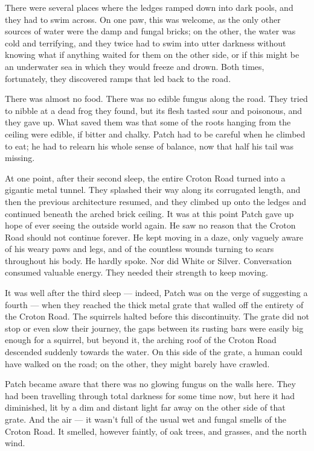 \documentclass[12pt]{book}
\begin{document}
There were several places where the ledges ramped down into dark pools, and they had to swim across. On one paw, this was welcome, as the only other sources of water were the damp and fungal bricks; on the other, the water was cold and terrifying, and they twice had to swim into utter darkness without knowing what if anything waited for them on the other side, or if this might be an underwater sea in which they would freeze and drown. Both times, fortunately, they discovered ramps that led back to the road.

There was almost no food. There was no edible fungus along the road. They tried to nibble at a dead frog they found, but its flesh tasted sour and poisonous, and they gave up. What saved them was that some of the roots hanging from the ceiling were edible, if bitter and chalky. Patch had to be careful when he climbed to eat; he had to relearn his whole sense of balance, now that half his tail was missing.

At one point, after their second sleep, the entire Croton Road turned into a gigantic metal tunnel. They splashed their way along its corrugated length, and then the previous architecture resumed, and they climbed up onto the ledges and continued beneath the arched brick ceiling. It was at this point Patch gave up hope of ever seeing the outside world again. He saw no reason that the Croton Road should not continue forever. He kept moving in a daze, only vaguely aware of his weary paws and legs, and of the countless wounds turning to scars throughout his body. He hardly spoke. Nor did White or Silver. Conversation consumed valuable energy. They needed their strength to keep moving.

It was well after the third sleep ---
indeed, Patch was on the verge of suggesting a fourth ---
when they reached the thick metal grate that walled off the entirety of the Croton Road. The squirrels halted before this discontinuity. The grate did not stop or even slow their journey, the gaps between its rusting bars were easily big enough for a squirrel, but beyond it, the arching roof of the Croton Road descended suddenly towards the water. On this side of the grate, a human could have walked on the road; on the other, they might barely have crawled.

Patch became aware that there was no glowing fungus on the walls here. They had been travelling through total darkness for some time now, but here it had diminished, lit by a dim and distant light far away on the other side of that grate. And the air ---
it wasn't full of the usual wet and fungal smells of the Croton Road. It smelled, however faintly, of oak trees, and grasses, and the north wind.
\end{document}
